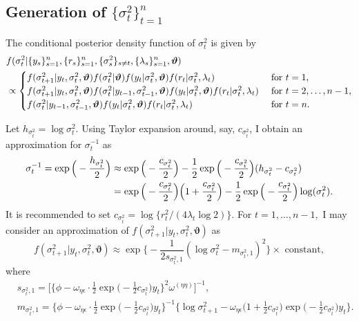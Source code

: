 \documentclass[11pt]{article}
\begin{document}
\subsection{Generation of $\{\sigma^2_t\}_{t=1}^n$}
The conditional posterior density function of $\sigma^2_t$ is given by
\begin{align}
&f(\sigma^2_{t} |\{y_s\}_{s=1}^n, \{r_s\}_{s=1}^n, \{\sigma^2_{s}\}_{s\neq t}, \{\lambda_s\}_{s=1}^n, \bm{\vartheta}) \notag \\
&\propto \begin{cases}
f(\sigma^2_{t+1} |y_t, \sigma^2_{t}, \bm{\vartheta}) f(\sigma^2_{t} |\bm{\vartheta}) 
f(y_t |\sigma^2_{t}, \bm{\vartheta}) f(r_t |\sigma^2_t, \lambda_t)
& \text{ for } t=1, \\
f(\sigma^2_{t+1} |y_t, \sigma^2_{t}, \bm{\vartheta}) f(\sigma^2_{t} |y_{t-1}, \sigma^2_{t-1}, \bm{\vartheta}) 
f(y_t |\sigma^2_{t}, \bm{\vartheta}) f(r_t |\sigma^2_t, \lambda_t) 
& \text{ for } t=2, \ldots, n-1, \\
f(\sigma^2_{t} |y_{t-1}, \sigma^2_{t-1}, \bm{\vartheta}) 
f(y_t |\sigma^2_{t}, \bm{\vartheta}) f(r_t |\sigma^2_t, \lambda_t) 
& \text{ for } t=n. \end{cases}
\end{align}

Let $h_{\sigma^2_t} =\log\sigma^2_t$. Using Taylor expansion around, say, $c_{\sigma^2_t}$, I obtain an approximation for $\sigma_t^{-1}$ as
\begin{align}
\sigma_t^{-1} =\exp\Big(-\frac{h_{\sigma^2_t}}{2}\Big) &\approx \exp\Big(-\frac{c_{\sigma^2_t}}{2}\Big) -\frac{1}{2}\exp\Big(-\frac{c_{\sigma^2_t}}{2}\Big)(h_{\sigma^2_t}-c_{\sigma^2_t}) \notag \\ &=\exp\Big(-\frac{c_{\sigma^2_t}}{2}\Big)\Big(1+\frac{c_{\sigma^2_t}}{2}\Big) -\frac{1}{2}\exp\Big(-\frac{c_{\sigma^2_t}}{2}\Big)\log(\sigma^2_t).
\end{align}
It is recommended to set $c_{\sigma^2_t} =\log\{ r_t^2/(4\lambda_t\log 2) \}$. 
For $t=1, \ldots, n-1,$ I may consider an approximation of $f(\sigma^2_{t+1} |y_t, \sigma^2_{t}, \bm{\vartheta})$ as 
\begin{equation}
f(\sigma^2_{t+1} |y_t, \sigma^2_{t}, \bm{\vartheta}) 
\approx \exp \bigg\{ -\frac{1}{2s_{\sigma^2_t, 1}}(\log\sigma^2_t -m_{\sigma^2_t, 1})^2 \bigg\} \times\text{ constant}, 
\end{equation}
where 
\begin{align}
&s_{\sigma^2_t, 1} =\bigg[ \bigg\{ \phi-\omega_{\eta\epsilon}\cdot\frac{1}{2}\exp\Big(-\frac{1}{2}c_{\sigma^2_t}\Big) y_t \bigg\}^2 \omega^{(\eta\eta)} \bigg]^{-1}, \\
&m_{\sigma^2_t, 1} 
= 
\bigg\{ \phi-\omega_{\eta\epsilon} \cdot\frac{1}{2}\exp\Big(-\frac{1}{2}c_{\sigma^2_t}\Big) y_t \bigg\}^{-1} 
\bigg\{\log\sigma^2_{t+1} -\omega_{\eta\epsilon} \Big(1+\frac{1}{2}c_{\sigma^2_t}\Big) \exp\Big(-\frac{1}{2}c_{\sigma^2_t}\Big) y_t \bigg\}. 
\end{align}
\end{document}
